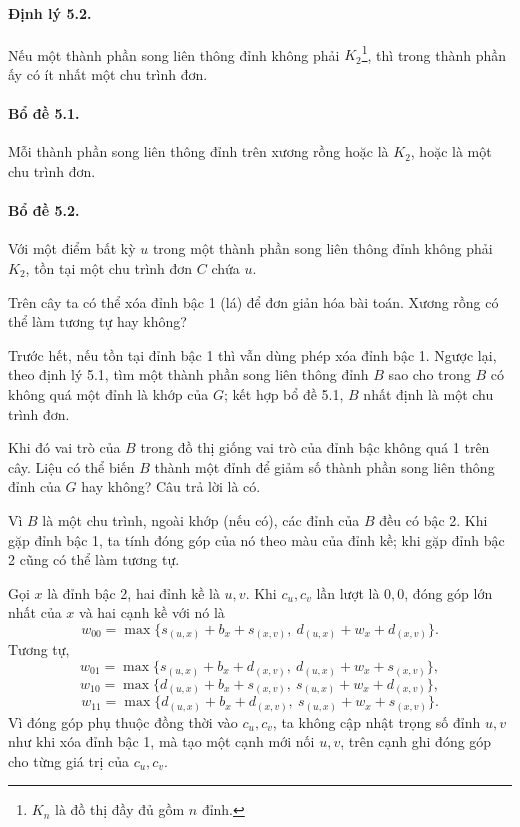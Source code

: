 \documentclass[11pt]{article}
\begin{document}
\paragraph{Định lý 5.2.}
Nếu một thành phần song liên thông đỉnh không phải \(K_2\)\footnote{\(K_n\)
là đồ thị đầy đủ gồm \(n\) đỉnh.}, thì trong thành phần ấy có ít nhất một chu
trình đơn.

\paragraph{Bổ đề 5.1.}
Mỗi thành phần song liên thông đỉnh trên xương rồng hoặc là \(K_2\), hoặc là
một chu trình đơn.

\paragraph{Bổ đề 5.2.}
Với một điểm bất kỳ \(u\) trong một thành phần song liên thông đỉnh không
phải \(K_2\), tồn tại một chu trình đơn \(C\) chứa \(u\).

Trên cây ta có thể xóa đỉnh bậc 1 (lá) để đơn giản hóa bài toán. Xương rồng
có thể làm tương tự hay không?

Trước hết, nếu tồn tại đỉnh bậc 1 thì vẫn dùng phép xóa đỉnh bậc 1. Ngược
lại, theo định lý 5.1, tìm một thành phần song liên thông đỉnh \(B\) sao cho
trong \(B\) có không quá một đỉnh là khớp của \(G\); kết hợp bổ đề 5.1, \(B\)
nhất định là một chu trình đơn.

Khi đó vai trò của \(B\) trong đồ thị giống vai trò của đỉnh bậc không quá 1
trên cây. Liệu có thể biến \(B\) thành một đỉnh để giảm số thành phần song
liên thông đỉnh của \(G\) hay không? Câu trả lời là có.

Vì \(B\) là một chu trình, ngoài khớp (nếu có), các đỉnh của \(B\) đều có bậc
2. Khi gặp đỉnh bậc 1, ta tính đóng góp của nó theo màu của đỉnh kề; khi gặp
đỉnh bậc 2 cũng có thể làm tương tự.

Gọi \(x\) là đỉnh bậc 2, hai đỉnh kề là \(u,v\). Khi \(c_u,c_v\) lần lượt là
\(0,0\), đóng góp lớn nhất của \(x\) và hai cạnh kề với nó là
\[
  w_{00}=\max\{s_{(u,x)}+b_x+s_{(x,v)},\
              d_{(u,x)}+w_x+d_{(x,v)}\}.
\]
Tương tự,
\[
  w_{01}=\max\{s_{(u,x)}+b_x+d_{(x,v)},\
              d_{(u,x)}+w_x+s_{(x,v)}\},
\]
\[
  w_{10}=\max\{d_{(u,x)}+b_x+s_{(x,v)},\
              s_{(u,x)}+w_x+d_{(x,v)}\},
\]
\[
  w_{11}=\max\{d_{(u,x)}+b_x+d_{(x,v)},\
              s_{(u,x)}+w_x+s_{(x,v)}\}.
\]
Vì đóng góp phụ thuộc đồng thời vào \(c_u,c_v\), ta không cập nhật trọng số
đỉnh \(u,v\) như khi xóa đỉnh bậc 1, mà tạo một cạnh mới nối \(u,v\), trên
cạnh ghi đóng góp cho từng giá trị của \(c_u,c_v\).
\end{document}

